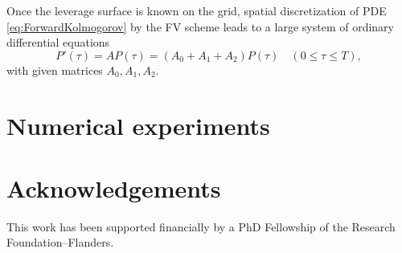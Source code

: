 \documentclass[10pt]{article}
\begin{document}
Once the leverage surface is known on the grid, spatial discretization of PDE \eqref{eq:ForwardKolmogorov} by the FV scheme leads to a large system of ordinary differential equations 
$$ P'(\tau) = A P(\tau) = (A_{0} + A_{1} + A_{2})P(\tau) \quad (0 \le \tau \le T),$$
with given matrices $A_{0}, A_{1}, A_{2}$. 




\setcounter{equation}{0}
\section{Numerical experiments}\label{Experiments}






\setcounter{equation}{0}
\section*{Acknowledgements} 
This work has been supported financially by a PhD Fellowship of the Research Foundation--Flanders.
\end{document}
